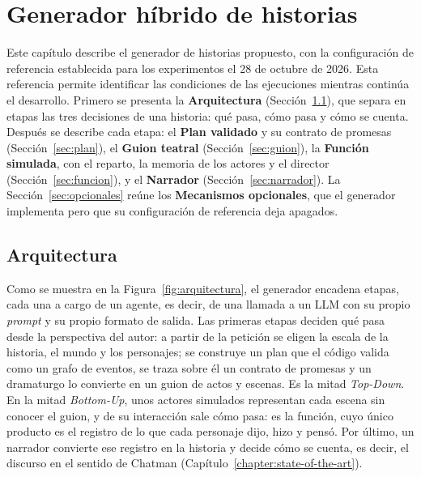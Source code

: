 \chapter{Generador híbrido de historias}\label{chapter:generator}

Este capítulo describe el generador de historias propuesto, con la configuración de referencia
establecida para los experimentos el 28 de octubre de 2026. Esta referencia permite identificar las
condiciones de las ejecuciones mientras continúa el desarrollo. Primero se presenta la
\textbf{Arquitectura} (Sección~\ref{sec:arquitectura}), que separa en etapas las tres decisiones de
una historia: qué pasa, cómo pasa y cómo se cuenta. Después se describe cada etapa: el \textbf{Plan
validado} y su contrato de promesas (Sección~\ref{sec:plan}), el \textbf{Guion teatral}
(Sección~\ref{sec:guion}), la \textbf{Función simulada}, con el reparto, la memoria de los actores
y el director (Sección~\ref{sec:funcion}), y el \textbf{Narrador} (Sección~\ref{sec:narrador}). La
Sección~\ref{sec:opcionales} reúne los \textbf{Mecanismos opcionales}, que el generador implementa
pero que su configuración de referencia deja apagados.

\section{Arquitectura}\label{sec:arquitectura}

Como se muestra en la Figura~\ref{fig:arquitectura}, el generador encadena etapas, cada una a cargo
de un agente, es decir, de una llamada a un LLM con su propio \textit{prompt} y su propio formato de
salida. Las primeras etapas deciden qué pasa desde la perspectiva del autor: a partir de la
petición se eligen la escala de la historia, el mundo y los personajes; se construye un plan que el
código valida como un grafo de eventos, se traza sobre él un contrato de promesas y un dramaturgo lo
convierte en un guion de actos y escenas. Es la mitad \textit{Top-Down}. En la mitad
\textit{Bottom-Up}, unos actores simulados representan cada escena sin conocer el guion, y de su
interacción sale cómo pasa: es la función, cuyo único producto es el registro de lo que cada
personaje dijo, hizo y pensó. Por último, un narrador convierte ese registro en la historia y
decide cómo se cuenta, es decir, el discurso en el sentido de Chatman
(Capítulo~\ref{chapter:state-of-the-art}).

